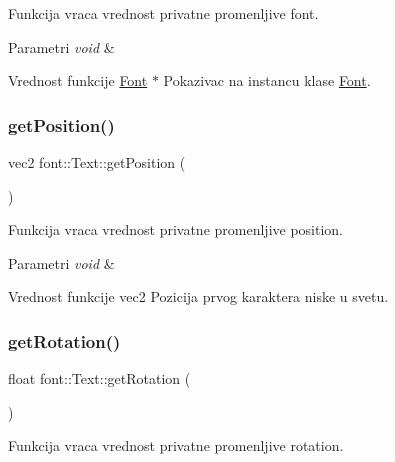 Funkcija vraca vrednost privatne promenljive font. 


\begin{DoxyParams}{Parametri}
{\em void} & \\
\hline
\end{DoxyParams}
\begin{DoxyReturn}{Vrednost funkcije}
\hyperlink{classfont_1_1Font}{Font} $\ast$ Pokazivac na instancu klase \hyperlink{classfont_1_1Font}{Font}. 
\end{DoxyReturn}
\mbox{\label{classfont_1_1Text_a6d9c2d80d02c59ce0811190ba0ee5cb8}} 
\subsubsection{\texorpdfstring{get\+Position()}{getPosition()}}
{\footnotesize\ttfamily vec2 font\+::\+Text\+::get\+Position (\begin{DoxyParamCaption}{ }\end{DoxyParamCaption})}



Funkcija vraca vrednost privatne promenljive position. 


\begin{DoxyParams}{Parametri}
{\em void} & \\
\hline
\end{DoxyParams}
\begin{DoxyReturn}{Vrednost funkcije}
vec2 Pozicija prvog karaktera niske u svetu. 
\end{DoxyReturn}
\mbox{\label{classfont_1_1Text_a5e59176805cd037ae0c528b84703961c}} 
\subsubsection{\texorpdfstring{get\+Rotation()}{getRotation()}}
{\footnotesize\ttfamily float font\+::\+Text\+::get\+Rotation (\begin{DoxyParamCaption}{ }\end{DoxyParamCaption})}



Funkcija vraca vrednost privatne promenljive rotation. 


